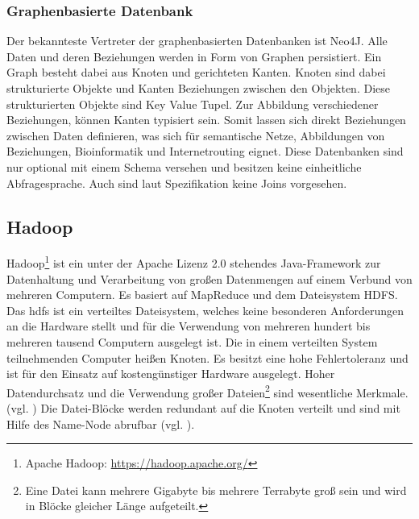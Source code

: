 \subsubsection{Graphenbasierte Datenbank}

Der bekannteste Vertreter der graphenbasierten Datenbanken ist Neo4J.
Alle Daten und deren Beziehungen werden in Form von Graphen persistiert.
Ein Graph besteht dabei aus Knoten und gerichteten Kanten.
Knoten sind dabei strukturierte Objekte und Kanten Beziehungen zwischen den Objekten.
Diese strukturierten Objekte sind Key Value Tupel.
Zur Abbildung verschiedener Beziehungen, können Kanten typisiert sein.
Somit lassen sich direkt Beziehungen zwischen Daten definieren, was sich für semantische Netze, Abbildungen von Beziehungen, Bioinformatik und Internetrouting eignet.
Diese Datenbanken sind nur optional mit einem Schema versehen und besitzen keine einheitliche Abfragesprache.
Auch sind laut Spezifikation keine Joins vorgesehen.


\subsection{Hadoop}
\label{hadoop}
Hadoop\footnote{Apache Hadoop: \url{https://hadoop.apache.org/}} ist ein unter der Apache Lizenz 2.0 stehendes Java-Framework zur Datenhaltung und Verarbeitung von großen Datenmengen auf einem Verbund von mehreren Computern.
Es basiert auf MapReduce und dem Dateisystem HDFS.
Das \Gls{hdfs} ist ein verteiltes Dateisystem, welches keine besonderen Anforderungen an die Hardware stellt und für die Verwendung von mehreren hundert bis mehreren tausend Computern ausgelegt ist.
Die in einem verteilten System teilnehmenden Computer heißen Knoten.
Es besitzt eine hohe Fehlertoleranz und ist für den Einsatz auf kostengünstiger Hardware ausgelegt.
Hoher Datendurchsatz und die Verwendung großer Dateien\footnote{Eine Datei kann mehrere Gigabyte bis mehrere Terrabyte groß sein und wird in Blöcke gleicher Länge aufgeteilt.} sind wesentliche Merkmale. (vgl. \cite[S.3]{paper:hadoop})
Die Datei-Blöcke werden redundant auf die Knoten verteilt und sind mit Hilfe des Name-Node abrufbar (vgl. \cite[S.7]{ba:dan}).

